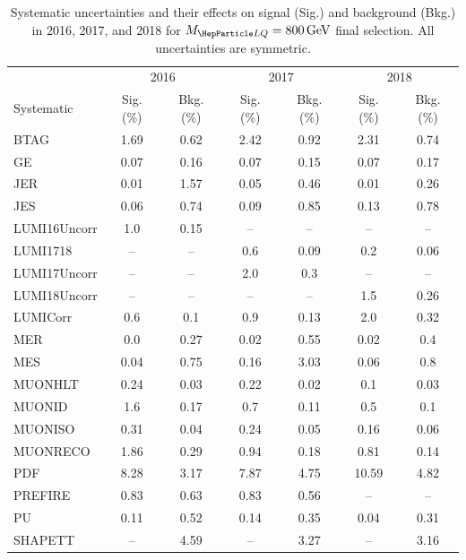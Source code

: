 \begin{table}[H]
	\begin{center}
        \begin{footnotesize}
			\caption{Systematic uncertainties and their effects on signal (Sig.) and background (Bkg.) in 2016, 2017, and 2018 for $\MLQ = \SI{800}{GeV}$ final selection. All uncertainties are symmetric.}
			\begin{tabular}{lcccccc} \hline \hline
				& \multicolumn{2}{c}{2016} & \multicolumn{2}{c}{2017} & \multicolumn{2}{c}{2018} \\
				Systematic & Sig. (\%) & Bkg. (\%) & Sig. (\%) & Bkg. (\%) & Sig. (\%) & Bkg. (\%) \\ \hline
				BTAG &  1.69  &  0.62 &  2.42  &  0.92 &  2.31  &  0.74 \\
				GE &  0.07  &  0.16 &  0.07  &  0.15 &  0.07  &  0.17 \\
				JER &  0.01  &  1.57 &  0.05  &  0.46 &  0.01  &  0.26 \\
				JES &  0.06  &  0.74 &  0.09  &  0.85 &  0.13  &  0.78 \\
				LUMI16Uncorr &  1.0  &  0.15 & -- & -- & -- & -- \\
				LUMI1718 & -- & -- &  0.6  &  0.09 &  0.2  &  0.06 \\
				LUMI17Uncorr & -- & -- &  2.0  &  0.3 & -- & -- \\
				LUMI18Uncorr & -- & -- & -- & -- &  1.5  &  0.26 \\
				LUMICorr &  0.6  &  0.1 &  0.9  &  0.13 &  2.0  &  0.32 \\
				MER &  0.0  &  0.27 &  0.02  &  0.55 &  0.02  &  0.4 \\
				MES &  0.04  &  0.75 &  0.16  &  3.03 &  0.06  &  0.8 \\
				MUONHLT &  0.24  &  0.03 &  0.22  &  0.02 &  0.1  &  0.03 \\
				MUONID &  1.6  &  0.17 &  0.7  &  0.11 &  0.5  &  0.1 \\
				MUONISO &  0.31  &  0.04 &  0.24  &  0.05 &  0.16  &  0.06 \\
				MUONRECO &  1.86  &  0.29 &  0.94  &  0.18 &  0.81  &  0.14 \\
				PDF &  8.28  &  3.17 &  7.87  &  4.75 &  10.59  &  4.82 \\
				PREFIRE &  0.83  &  0.63 &  0.83  &  0.56 & -- & -- \\
				PU &  0.11  &  0.52 &  0.14  &  0.35 &  0.04  &  0.31 \\
				SHAPETT & -- &  4.59 & -- &  3.27 & -- &  3.16 \\

\end{tabular}
\end{footnotesize}
\end{center}
\end{table}
